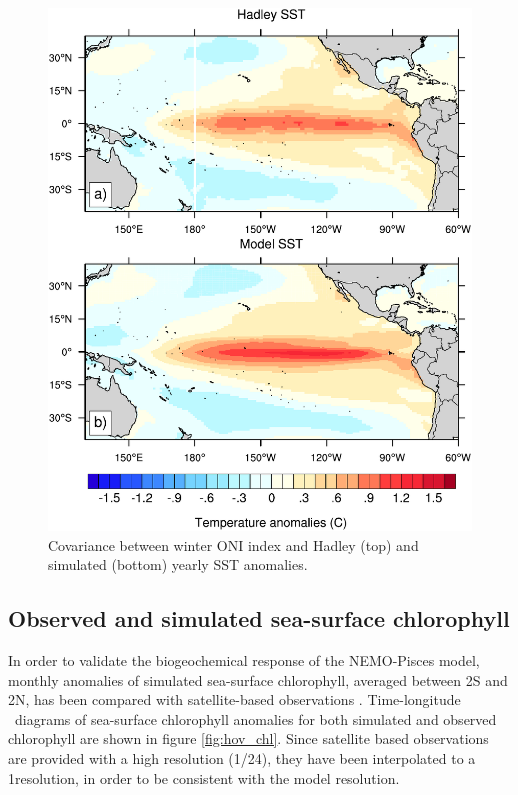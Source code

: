 \begin{figure}[h!]
	\centering
	\includegraphics[scale=0.75] {figs/covariance_maps_hadley_model.pdf}
	\caption{Covariance between winter ONI index and Hadley (top) and simulated (bottom) yearly SST anomalies.}
	\label{fig:cov-sst}
\end{figure}

\subsection{Observed and simulated sea-surface chlorophyll}

In order to validate the biogeochemical response of the NEMO-Pisces model, monthly anomalies of simulated sea-surface chlorophyll, averaged between 2\degree S and 2\degree N, has been compared with satellite-based observations \citep{sathyendranathOceanColourTimeSeries2019}. Time-longitude \hov\ diagrams of sea-surface chlorophyll anomalies for both simulated and observed chlorophyll are shown in figure \ref{fig:hov_chl}. Since satellite based observations are provided with a high resolution (1/24\degree), they have been interpolated to a 
1\degree resolution, in order to be consistent with the model resolution.

